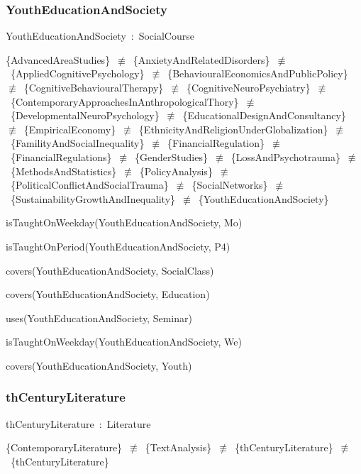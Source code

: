 \documentclass{article}
\begin{document}
\subsubsection*{YouthEducationAndSociety}

YouthEducationAndSociety~:~SocialCourse

\{AdvancedAreaStudies\}~\ensuremath{\not\equiv}~\{AnxietyAndRelatedDisorders\}~\ensuremath{\not\equiv}~\{AppliedCognitivePsychology\}~\ensuremath{\not\equiv}~\{BehaviouralEconomicsAndPublicPolicy\}~\ensuremath{\not\equiv}~\{CognitiveBehaviouralTherapy\}~\ensuremath{\not\equiv}~\{CognitiveNeuroPsychiatry\}~\ensuremath{\not\equiv}~\{ContemporaryApproachesInAnthropologicalThory\}~\ensuremath{\not\equiv}~\{DevelopmentalNeuroPsychology\}~\ensuremath{\not\equiv}~\{EducationalDesignAndConsultancy\}~\ensuremath{\not\equiv}~\{EmpiricalEconomy\}~\ensuremath{\not\equiv}~\{EthnicityAndReligionUnderGlobalization\}~\ensuremath{\not\equiv}~\{FamilityAndSocialInequality\}~\ensuremath{\not\equiv}~\{FinancialRegulation\}~\ensuremath{\not\equiv}~\{FinancialRegulations\}~\ensuremath{\not\equiv}~\{GenderStudies\}~\ensuremath{\not\equiv}~\{LossAndPsychotrauma\}~\ensuremath{\not\equiv}~\{MethodsAndStatistics\}~\ensuremath{\not\equiv}~\{PolicyAnalysis\}~\ensuremath{\not\equiv}~\{PoliticalConflictAndSocialTrauma\}~\ensuremath{\not\equiv}~\{SocialNetworks\}~\ensuremath{\not\equiv}~\{SustainabilityGrowthAndInequality\}~\ensuremath{\not\equiv}~\{YouthEducationAndSociety\}

isTaughtOnWeekday(YouthEducationAndSociety, Mo)

isTaughtOnPeriod(YouthEducationAndSociety, P4)

covers(YouthEducationAndSociety, SocialClass)

covers(YouthEducationAndSociety, Education)

uses(YouthEducationAndSociety, Seminar)

isTaughtOnWeekday(YouthEducationAndSociety, We)

covers(YouthEducationAndSociety, Youth)

\subsubsection*{thCenturyLiterature}

thCenturyLiterature~:~Literature

\{ContemporaryLiterature\}~\ensuremath{\not\equiv}~\{TextAnalysis\}~\ensuremath{\not\equiv}~\{thCenturyLiterature\}~\ensuremath{\not\equiv}~\{thCenturyLiterature\}
\end{document}
